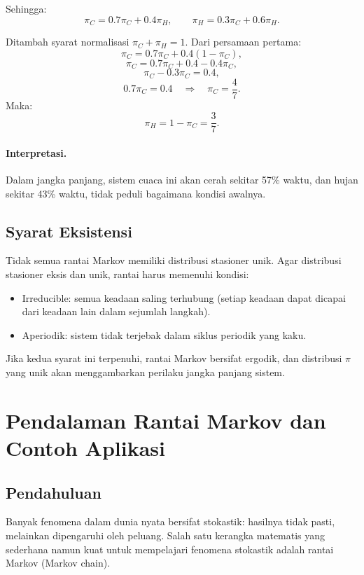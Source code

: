 \documentclass{bukumjh}
\begin{document}
Sehingga:
\[
\pi_C = 0.7 \pi_C + 0.4 \pi_H, \qquad
\pi_H = 0.3 \pi_C + 0.6 \pi_H.
\]

Ditambah syarat normalisasi $\pi_C + \pi_H = 1$. Dari persamaan pertama:
\[
\pi_C = 0.7\pi_C + 0.4(1-\pi_C),
\]
\[
\pi_C = 0.7\pi_C + 0.4 - 0.4\pi_C,
\]
\[
\pi_C - 0.3\pi_C = 0.4,
\]
\[
0.7\pi_C = 0.4 \quad \Rightarrow \quad \pi_C = \frac{4}{7}.
\]
Maka:
\[
\pi_H = 1 - \pi_C = \frac{3}{7}.
\]

\paragraph{Interpretasi.}  
Dalam jangka panjang, sistem cuaca ini akan cerah sekitar 57\% waktu, dan hujan sekitar 43\% waktu, tidak peduli bagaimana kondisi awalnya.

\subsection{Syarat Eksistensi}

Tidak semua rantai Markov memiliki distribusi stasioner unik. Agar distribusi stasioner eksis dan unik, rantai harus memenuhi kondisi:
\begin{itemize}
    \item {\jsg Irreducible:} semua keadaan saling terhubung (setiap keadaan dapat dicapai dari keadaan lain dalam sejumlah langkah).
    \item {\jsg Aperiodik:} sistem tidak terjebak dalam siklus periodik yang kaku.
\end{itemize}

Jika kedua syarat ini terpenuhi, rantai Markov bersifat {\jsg ergodik}, dan distribusi $\pi$ yang unik akan menggambarkan perilaku jangka panjang sistem.


\section{Pendalaman Rantai Markov dan Contoh Aplikasi}

\subsection{Pendahuluan}
Banyak fenomena dalam dunia nyata bersifat stokastik: hasilnya tidak pasti, melainkan dipengaruhi oleh peluang. Salah satu kerangka matematis yang sederhana namun kuat untuk mempelajari fenomena stokastik adalah {\jsg rantai Markov} (Markov chain). 
\end{document}
